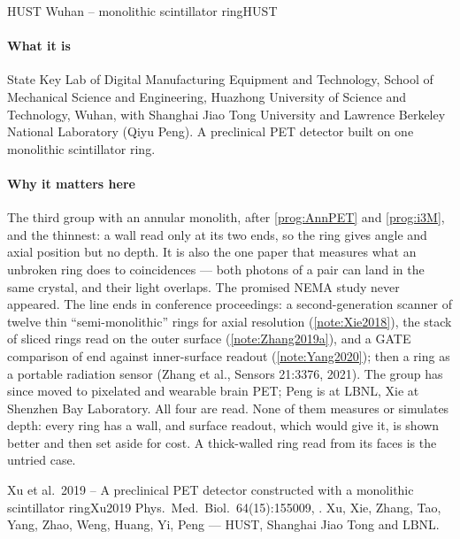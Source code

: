 \begin{programnote}{HUST Wuhan -- monolithic scintillator ring}{HUST}

\paragraph{What it is}
State Key Lab of Digital Manufacturing Equipment and Technology, School of
Mechanical Science and Engineering, Huazhong University of Science and
Technology, Wuhan, with Shanghai Jiao Tong University and Lawrence Berkeley
National Laboratory (Qiyu Peng). A preclinical PET detector built on one
monolithic scintillator ring.

\paragraph{Why it matters here}
The third group with an annular monolith, after \ref{prog:AnnPET} and
\ref{prog:i3M}, and the thinnest: a  wall read only at its two ends, so
the ring gives angle and axial position but no depth. It is also the one paper
that measures what an unbroken ring does to coincidences --- both photons of a
pair can land in the same crystal, and their light overlaps.
The promised NEMA study never appeared. The line ends in conference
proceedings: a second-generation scanner of twelve thin ``semi-monolithic''
rings for axial resolution (\ref{note:Xie2018}), the stack of sliced rings
read on the outer surface (\ref{note:Zhang2019a}), and a GATE comparison of end
against inner-surface readout (\ref{note:Yang2020}); then a ring as a portable radiation
sensor (Zhang et al., Sensors 21:3376, 2021). The group has since moved to
pixelated and wearable brain PET; Peng is at LBNL, Xie at Shenzhen Bay
Laboratory.
All four are read. None of them measures or simulates depth: every ring has
a  wall, and surface readout, which would give it, is shown better and
then set aside for cost. A thick-walled ring read from its faces is the
untried case.

\begin{papernote}{Xu et al.\ 2019 -- A preclinical PET detector constructed with a monolithic scintillator ring}{Xu2019}
Phys.\ Med.\ Biol.\ 64(15):155009, . Xu, Xie,
Zhang, Tao, Yang, Zhao, Weng, Huang, Yi, Peng --- HUST, Shanghai Jiao Tong and
LBNL.


\end{papernote}
\end{programnote}
